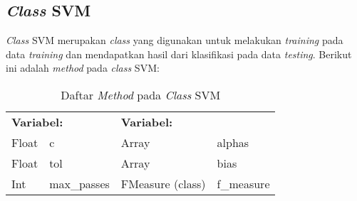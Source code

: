 \subsection{\textit{Class} SVM}
\textit{Class }SVM merupakan \textit{class }yang digunakan untuk melakukan \textit{training} pada data \textit{training} dan mendapatkan hasil dari klasifikasi pada data \textit{testing}. Berikut ini adalah \textit{method} pada \textit{class }SVM:
\begin{table}[H]
	\caption{Daftar \textit{Method} pada \textit{Class} SVM}
	\centering
	\small
	\begin{adjustbox}{width=1\textwidth}	
	\begin{tabular}{|p{4cm} p{2.1cm} p{4cm} p{2.1cm}|}
		\hline
		\multicolumn{2}{|l}{\textbf{Variabel:}}&\multicolumn{2}{l|}{\textbf{Variabel:}}\\
		Float&c&Array&alphas\\
		Float&tol&Array&bias \\
		Int&max\_passes&FMeasure (class)&f\_measure\\
		\hline
	\end{tabular}
	\end{adjustbox}
\end{table}
